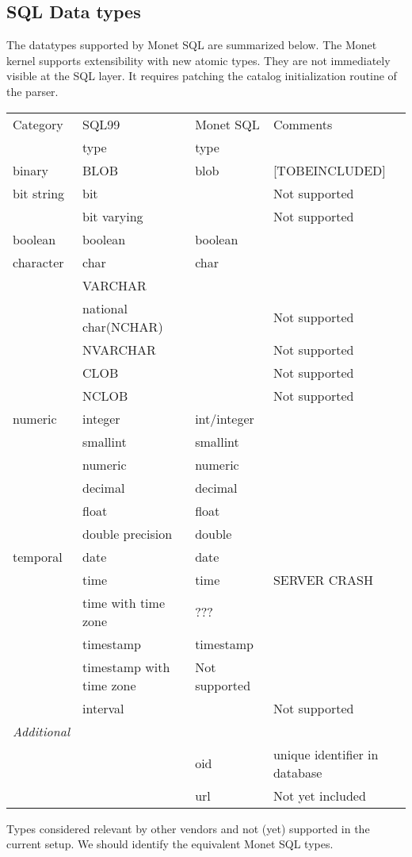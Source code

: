 \documentclass[10pt,twocolumn,fleqn]{article}
\begin{document}
\subsection{SQL Data types}
The datatypes supported by Monet SQL are summarized below.
The Monet kernel supports extensibility with new atomic types.
They are not immediately visible at the SQL layer. It requires
patching the catalog initialization routine of the parser.

\begin{tabular}{l |l | l | l}
Category	& SQL99 & Monet SQL & Comments\\
		& type	& type	&	\\\hline
binary		& BLOB	& blob	& 	[TOBEINCLUDED] \\
bit string	& bit	&	&	Not supported\\
		& bit varying&	&	Not supported\\
boolean		& boolean& boolean&		\\
character	& char	& char	&	\\
		& VARCHAR &	&	\\
		& national char(NCHAR)&& Not supported\\
		& NVARCHAR&	& 	Not supported\\
		& CLOB	&	&	Not supported\\
		& NCLOB	&	&	Not supported\\
numeric		& integer& int/integer &\\
		& smallint&smallint&	\\
		&numeric &numeric&	\\
		& decimal&decimal&	 \\
		& float & float&	\\
		& double precision& double&	\\
temporal	& date & date&	\\
		& time & time& SERVER CRASH	\\
		& time with time zone& ???\\
		& timestamp& timestamp&	\\
		& timestamp with time zone& Not supported\\
		& interval &	& Not supported\\\hline
{\em Additional}&	&	&	\\
		&	& oid	& unique identifier in database\\
		&	& url	& Not yet included\\
\end{tabular}

Types considered relevant by other vendors and not (yet) supported in the
current setup. We should identify the equivalent Monet SQL types.
\end{document}
